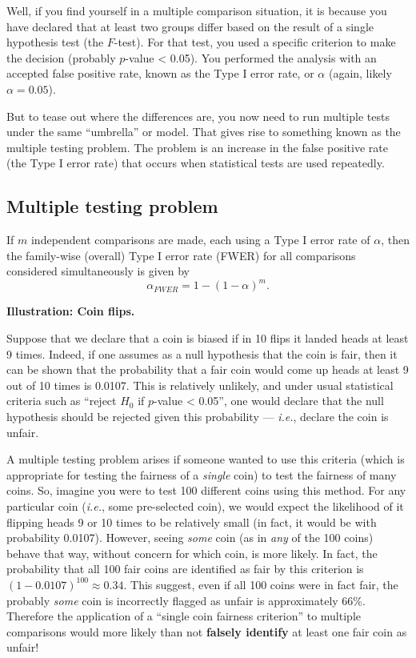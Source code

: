 \documentclass[
]{book}
\begin{document}
Well, if you find yourself in a multiple comparison situation, it is because you have declared that at least two groups differ based on the result of a single hypothesis test (the \(F\)-test).
For that test, you used a specific criterion to make the decision (probably \(p\)-value \textless{} 0.05).
You performed the analysis with an accepted false positive rate, known as the Type I error rate, or \(\alpha\) (again, likely \(\alpha=0.05\)).

But to tease out where the differences are, you now need to run multiple tests under the same ``umbrella'' or model.
That gives rise to something known as the multiple testing problem.
The problem is an increase in the false positive rate (the Type I error rate) that occurs when statistical tests are used repeatedly.

\hypertarget{multiple-testing-problem}{%
\subsection{Multiple testing problem}\label{multiple-testing-problem}}

If \(m\) independent comparisons are made, each using a Type I error rate of \(\alpha\), then the family-wise (overall) Type I error rate (FWER) for all comparisons considered simultaneously is given by
\[\alpha_{FWER} = 1 -  (1 - \alpha)^m.\]

\textbf{Illustration: Coin flips.}

Suppose that we declare that a coin is biased if in 10 flips it landed heads at least 9 times.
Indeed, if one assumes as a null hypothesis that the coin is fair, then it can be shown that the probability that a fair coin would come up heads at least 9 out of 10 times is 0.0107.
This is relatively unlikely, and under usual statistical criteria such as ``reject \(H_0\) if \(p\)-value \textless{} 0.05'', one would declare that the null hypothesis should be rejected given this probability --- \emph{i.e.}, declare the coin is unfair.

A multiple testing problem arises if someone wanted to use this criteria (which is appropriate for testing the fairness of a \emph{single} coin) to test the fairness of many coins.
So, imagine you were to test 100 different coins using this method.
For any particular coin (\emph{i.e.}, some pre-selected coin), we would expect the likelihood of it flipping heads 9 or 10 times to be relatively small (in fact, it would be with probability 0.0107).
However, seeing \emph{some} coin (as in \emph{any} of the 100 coins) behave that way, without concern for which coin, is more likely.
In fact, the probability that all 100 fair coins are identified as fair by this criterion is \((1 - 0.0107)^{100} \approx 0.34\). This suggest, even if all 100 coins were in fact fair, the probably \emph{some} coin is incorrectly flagged as unfair is approximately 66\%.
Therefore the application of a ``single coin fairness criterion'' to multiple comparisons would more likely than not \textbf{falsely identify} at least one fair coin as unfair!
\end{document}
